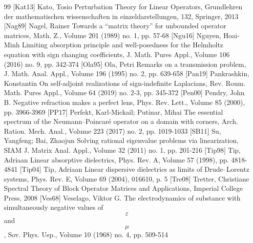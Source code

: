 \begin{thebibliography}{99}
 [Kat13] Kato, Tosio Perturbation Theory for Linear Operators, Grundlehren der mathematischen wissenschaften in einzeldarstellungen, 132, Springer, 2013
 [Nag89] Nagel, Rainer Towards a “matrix theory” for unbounded operator matrices, Math. Z., Volume 201 (1989) no. 1, pp. 57-68
 [Ngu16] Nguyen, Hoai-Minh Limiting absorption principle and well-posedness for the Helmholtz equation with sign changing coefficients, J. Math. Pures Appl., Volume 106 (2016) no. 9, pp. 342-374
 [Ola95] Ola, Petri Remarks on a transmission problem, J. Math. Anal. Appl., Volume 196 (1995) no. 2, pp. 639-658
 [Pan19] Pankrashkin, Konstantin On self-adjoint realizations of sign-indefinite Laplacians, Rev. Roum. Math. Pures Appl., Volume 64 (2019) no. 2-3, pp. 345-372
 [Pen00] Pendry, John B. Negative refraction makes a perfect lens, Phys. Rev. Lett., Volume 85 (2000), pp. 3966-3969
 [PP17] Perfekt, Karl-Mickail; Putinar, Mihai The essential spectrum of the Neumann–Poincaré operator on a domain with corners, Arch. Ration. Mech. Anal., Volume 223 (2017) no. 2, pp. 1019-1033
 [SB11] Su, Yangfeng; Bai, Zhaojun Solving rational eigenvalue problems via linearization, SIAM J. Matrix Anal. Appl., Volume 32 (2011) no. 1, pp. 201-216
 [Tip98] Tip, Adriaan Linear absorptive dielectrics, Phys. Rev. A, Volume 57 (1998), pp. 4818-4841
 [Tip04] Tip, Adriaan Linear dispersive dielectrics as limits of Drude–Lorentz systems, Phys. Rev. E, Volume 69 (2004), 016610, p. 5
 [Tre08] Tretter, Christiane Spectral Theory of Block Operator Matrices and Applications, Imperial College Press, 2008
 [Ves68] Veselago, Viktor G. The electrodynamics of substance with simultaneously negative values of $$\varepsilon $$ and $$\mu $$, Sov. Phys. Usp., Volume 10 (1968) no. 4, pp. 509-514
\end{thebibliography}
